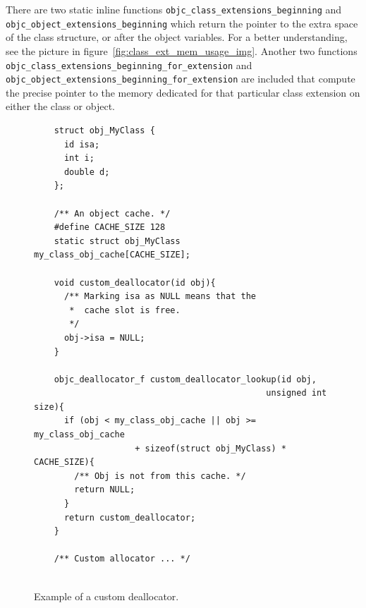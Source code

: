 There are two static inline functions \texttt{objc\_class\_extensions\_beginning} \newline{}and \texttt{objc\_object\_extensions\_beginning} which return the pointer to the extra space of the class structure, or after the object variables. For a better understanding, see the picture in figure~\ref{fig:class_ext_mem_usage_img}. Another two functions \newline{}\texttt{objc\_class\_extensions\_beginning\_for\_extension} and \newline{}\texttt{objc\_object\_extensions\_beginning\_for\_extension} are included that compute the precise pointer to the memory dedicated for that particular class extension on either the class or object.


\begin{figure}[H] 
  \begin{verbatim}
    struct obj_MyClass {
      id isa;
      int i;
      double d;
    };
    
    /** An object cache. */
    #define CACHE_SIZE 128
    static struct obj_MyClass my_class_obj_cache[CACHE_SIZE];
    
    void custom_deallocator(id obj){
      /** Marking isa as NULL means that the
       *  cache slot is free.
       */
      obj->isa = NULL;
    }
    
    objc_deallocator_f custom_deallocator_lookup(id obj, 
                                              unsigned int size){
      if (obj < my_class_obj_cache || obj >= my_class_obj_cache 
                    + sizeof(struct obj_MyClass) * CACHE_SIZE){
        /** Obj is not from this cache. */
        return NULL;
      }
      return custom_deallocator;
    }
    
    /** Custom allocator ... */
    
  \end{verbatim}
  \centering{}
  \caption{Example of a custom deallocator.}
  \label{fig:class_ext_dealloc_example}
\end{figure}

